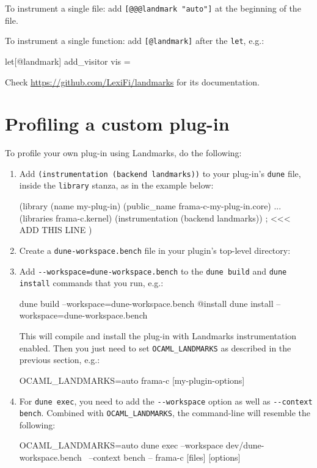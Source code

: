 To instrument a single file: add \verb+[@@@landmark "auto"]+ at the beginning
of the file.

To instrument a single function: add \verb+[@landmark]+ after the \texttt{let},
e.g.:

\begin{ocamlcode}
  let[@landmark] add_visitor vis =
\end{ocamlcode}

Check \url{https://github.com/LexiFi/landmarks} for its documentation.

\section{Profiling a custom plug-in}

To profile your own plug-in using Landmarks, do the following:

\begin{enumerate}
\item Add \verb|(instrumentation (backend landmarks))| to your plug-in's
  \verb|dune| file, inside the \verb|library| stanza, as in the example below:
\begin{dunecode}
 (library
   (name my-plug-in)
   (public_name frama-c-my-plug-in.core)
   ...
   (libraries frama-c.kernel)
   (instrumentation (backend landmarks)) ; <<< ADD THIS LINE
 )
\end{dunecode}
\item Create a \verb|dune-workspace.bench| file in your plugin's top-level
  directory:
\item Add \verb|--workspace=dune-workspace.bench| to the \verb|dune build|
  and \verb|dune install| commands that you run, e.g.:
\begin{logs}
dune build --workspace=dune-workspace.bench @install
dune install --workspace=dune-workspace.bench
\end{logs}
This will compile and install the plug-in with Landmarks instrumentation
enabled. Then you just need to set \verb|OCAML_LANDMARKS| as described in the
previous section, e.g.:
\begin{logs}
OCAML_LANDMARKS=auto frama-c [my-plugin-options]
\end{logs}
\item For \verb|dune exec|, you need to add the \verb|--workspace| option
  as well as \verb|--context bench|. Combined with \verb|OCAML_LANDMARKS|,
  the command-line will resemble the following:
\begin{logs}
OCAML_LANDMARKS=auto dune exec --workspace dev/dune-workspace.bench \
  --context bench -- frama-c [files] [options]
\end{logs}
\end{enumerate}
